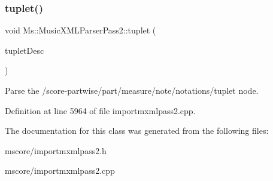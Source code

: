 \subsubsection{\texorpdfstring{tuplet()}{tuplet()}}
{\footnotesize\ttfamily void Ms\+::\+Music\+X\+M\+L\+Parser\+Pass2\+::tuplet (\begin{DoxyParamCaption}\item[{\hyperlink{struct_ms_1_1_music_xml_tuplet_desc}{Music\+Xml\+Tuplet\+Desc} \&}]{tuplet\+Desc }\end{DoxyParamCaption})}

Parse the /score-\/partwise/part/measure/note/notations/tuplet node. 

Definition at line 5964 of file importmxmlpass2.\+cpp.



The documentation for this class was generated from the following files\+:\begin{DoxyCompactItemize}
\item 
mscore/importmxmlpass2.\+h\item 
mscore/importmxmlpass2.\+cpp\end{DoxyCompactItemize}
